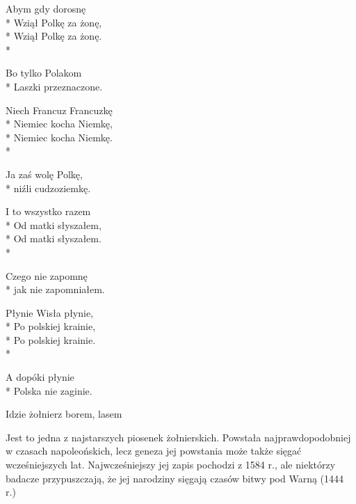 \begin{lyrics}[multicol=true,longestline={,,Ojcze nasz'' i ,,Zdrowaś''}]
Abym gdy dorosnę\\*
Wziął Polkę za żonę,\\*
Wziął Polkę za żonę.\\*
\begin{markverses}%
Bo tylko Polakom\\*
Laszki przeznaczone.
\end{markverses}

Niech Francuz Francuzkę\\*
Niemiec kocha Niemkę,\\*
Niemiec kocha Niemkę.\\*
\begin{markverses}%
Ja zaś wolę Polkę,\\*
niźli cudzoziemkę.
\end{markverses}

I to wszystko razem\\*
Od matki słyszałem,\\*
Od matki słyszałem.\\*
\begin{markverses}%
Czego nie zapomnę\\*
jak nie zapomniałem.
\end{markverses}

Płynie Wisła płynie,\\*
Po polskiej krainie,\\*
Po polskiej krainie.\\*
\begin{markverses}%
A dopóki płynie\\*
Polska nie zaginie.
\end{markverses}
\end{lyrics}



\song
{Idzie żołnierz borem, lasem}
\begin{info}Jest to jedna z najstarszych piosenek żołnierskich. Powstała najprawdopodobniej w czasach napoleońskich, lecz geneza jej powstania może także sięgać wcześniejszych lat. Najwcześniejszy jej zapis pochodzi z 1584 r., ale niektórzy badacze przypuszczają, że jej narodziny sięgają czasów bitwy pod Warną (1444 r.)\end{info}

